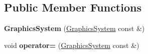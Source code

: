 \subsection*{Public Member Functions}
\begin{DoxyCompactItemize}
\item 
\hypertarget{class_graphics_system_a06c79c8ebe88092f8feff538f4082bd9}{}{\bfseries Graphics\+System} (\hyperlink{class_graphics_system}{Graphics\+System} const \&)\label{class_graphics_system_a06c79c8ebe88092f8feff538f4082bd9}

\item 
\hypertarget{class_graphics_system_a38d30a6bde4bf27c06ca814ed760e25b}{}void {\bfseries operator=} (\hyperlink{class_graphics_system}{Graphics\+System} const \&)\label{class_graphics_system_a38d30a6bde4bf27c06ca814ed760e25b}


\end{DoxyCompactItemize}
